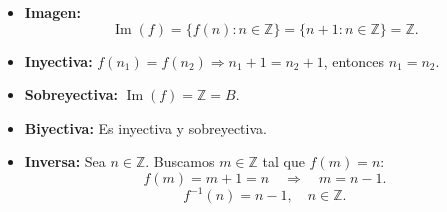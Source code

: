 \documentclass[a4paper,12pt]{article}
\begin{document}
\begin{ejercicio}[title=Ejercicio 19]
\begin{itemize}
  \item \textbf{Imagen:} 
  \[
    \operatorname{Im}(f) = \{f(n) : n \in \mathbb{Z}\} = \{n+1 : n \in \mathbb{Z}\} = \boxed{\mathbb{Z}}.
  \]
  \item \textbf{Inyectiva:} $f(n_1)=f(n_2)\Rightarrow n_1+1=n_2+1$, entonces $n_1=n_2$. 
  \item \textbf{Sobreyectiva:} $\operatorname{Im}(f) = \mathbb{Z} = B$. 
  \item \textbf{Biyectiva:} Es inyectiva y sobreyectiva. 
  \item \textbf{Inversa:}  
Sea $n \in \mathbb{Z}$. Buscamos $m \in \mathbb{Z}$ tal que $f(m) = n$:  
\[
f(m) = m + 1 = n \quad \Rightarrow \quad m = n - 1.
\]
\[
\boxed{f^{-1}(n) = n - 1, \quad n \in \mathbb{Z}}.
\]
\end{itemize}

\end{ejercicio}
\end{document}
